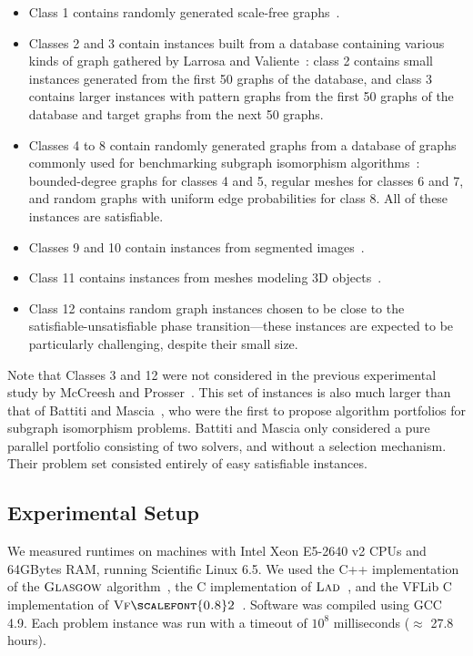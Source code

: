 \documentclass{llncs}
\newcommand{\VFtwo}{$\textsc{Vf{\scalefont{0.8}2}}$\xspace}
\newcommand{\Glasgow}{$\textsc{Glasgow}$\xspace}
\newcommand{\LAD}{$\textsc{Lad}$\xspace}
\begin{document}
\begin{itemize}
\item Class 1 contains randomly generated scale-free graphs~\cite{constraints10}.
\item Classes 2 and 3 contain instances built from a database containing
    various kinds of graph gathered by Larrosa and Valiente~\cite{LV02}: class
    2 contains small instances generated from the first 50 graphs of the
    database, and class 3 contains larger instances with pattern graphs from
    the first 50 graphs of the database and target graphs from the next 50
    graphs.
\item Classes 4 to 8 contain randomly generated graphs from a database of
    graphs commonly used for benchmarking subgraph isomorphism
    algorithms~\cite{GraphDatabase1,GraphDatabase2}: bounded-degree graphs for
    classes 4 and 5, regular meshes for classes 6 and 7, and random graphs with
    uniform edge probabilities for class 8. All of these instances are
    satisfiable.
\item Classes 9 and 10 contain instances from segmented images~\cite{pr15,cviu11}.
\item Class 11 contains instances from meshes modeling 3D objects~\cite{cviu11}.
\item Class 12 contains random graph instances chosen to be close to the satisfiable-unsatisfiable
    phase transition---these instances are expected to be particularly challenging, despite their
    small size.
\end{itemize}

Note that Classes 3 and 12 were not considered in the previous experimental study by McCreesh and
Prosser~\cite{McCreesh:2015}.  This set of instances is also much larger than that of Battiti and
Mascia~\cite{battiti-mascia07}, who were the first to propose algorithm portfolios for subgraph
isomorphism problems.  Battiti and Mascia only considered a pure parallel portfolio consisting of
two solvers, and without a selection mechanism. Their problem set consisted entirely of easy
satisfiable instances.

\subsection{Experimental Setup}

We measured runtimes on machines with Intel Xeon E5-2640 v2 CPUs and 64GBytes RAM, running
Scientific Linux 6.5. We used the C++ implementation of the \Glasgow algorithm~\cite{McCreesh:2015},
the C implementation of \LAD{}~\cite{Solnon:2010}, and the VFLib C
implementation of \VFtwo{}~\cite{Cordella:2004}. Software was compiled using GCC 4.9. Each problem instance was run with a
timeout of $10^8$ milliseconds ($\approx$ 27.8 hours).
\end{document}
